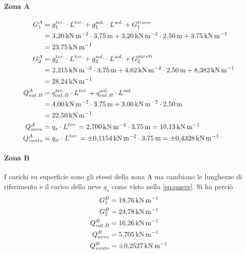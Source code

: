 \paragraph*{Zona A} 
\[
\begin{split}
G_1^A &=  g_1^{ter.}\cdot L^{ter.} + g_1^{sol.}\cdot L^{sol.} + G_1^{trave} \\
&= \SI{3.20}{\kilo\newton\per\square\meter}\cdot\SI{3.75}{\meter} + \SI{3.20}{\kilo\newton\per\square\meter}\cdot\SI{2.50}{\meter} + \SI{3.75}{\kilo\newton\per\meter} \\
&= \SI{23.75}{\kilo\newton\per\meter} \\
G_2^A &= g_2^{ter.}\cdot L^{ter.} + g_2^{sol.}\cdot L^{sol.} + G_2^{pareti} \\
&= \SI{2.215}{\kilo\newton\per\square\meter}\cdot\SI{3.75}{\meter} + \SI{4.62}{\kilo\newton\per\square\meter}\cdot\SI{2.50}{\meter} + \SI{8.382}{\kilo\newton\per\meter} \\
&= \SI{28.24}{\kilo\newton\per\meter}\\
Q_{cat. B}^A &= q_{cat. B}^{ter.}\cdot L^{ter.} + q_{cat. B}^{sol.}\cdot L^{sol.} \\
&= \SI{4.00}{\kilo\newton\per\square\meter}\cdot\SI{3.75}{\meter} + \SI{3.00}{\kilo\newton\per\square\meter}\cdot\SI{2.50}{\meter} \\
&= \SI{22.50}{\kilo\newton\per\meter}\\
Q_{neve}^A &= q_s \cdot L^{ter.} = \SI{2.700}{\kilo\newton\per\square\meter}\cdot\SI{3.75}{\meter} = \SI{10.13}{\kilo\newton\per\meter}\\
Q_{vento}^A &= q_w \cdot L^{ter.} = \SI{\pm 0.1154}{\kilo\newton\per\square\meter}\cdot\SI{3.75}{\meter} = \SI{\pm 0.4328}{\kilo\newton\per\meter}
\end{split}
\]
\paragraph*{Zona B} I carichi su superficie sono gli stessi della zona A ma cambiano le lunghezze di riferimento e il carico della neve $q_s$ come visto nella \eqref{eq:qneve}. 
Si ha perciò
\begin{align*}
G_1^B &= \SI{18.76}{\kilo\newton\per\meter}\\
G_2^B &= \SI{24.78}{\kilo\newton\per\meter}\\
Q_{cat. B}^B &=  \SI{16.26}{\kilo\newton\per\meter}\\
Q_{neve}^B &= \SI{5.705}{\kilo\newton\per\meter}\\
Q_{vento}^B &= \SI{\pm 0.2527}{\kilo\newton\per\meter}
\end{align*}
